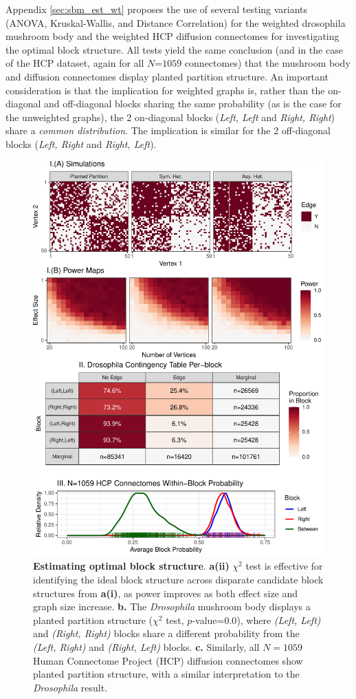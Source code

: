 Appendix \ref{sec:sbm_est_wt} proposes the use of several testing variants (ANOVA, Kruskal-Wallis, and Distance Correlation) for the weighted drosophila mushroom body and the weighted HCP diffusion connectomes for investigating the optimal block structure. All tests yield the same conclusion (and in the case of the HCP dataset, again for all $N$=$1059$ connectomes) that the mushroom body and diffusion connectomes display planted partition structure. An important consideration is that the implication for weighted graphs is, rather than the on-diagonal and off-diagonal blocks sharing the same probability (as is the case for the unweighted graphs), the 2 on-diagonal blocks (\textit{Left, Left} and \textit{Right, Right}) share a \textit{common distribution}. The implication is similar for the 2 off-diagonal blocks (\textit{Left, Right} and \textit{Right, Left}).

\begin{figure}
    \centering
    \includegraphics[width=.8\linewidth]{figures/dnd/sbm_uwt.pdf}
    \caption{\textbf{Estimating optimal block structure}. \textbf{a(ii)} $\chi^2$ test is effective for identifying the ideal block structure across disparate candidate block structures from \textbf{a(i)}, as power improves as both effect size and graph size increase. \textbf{b.} The \textit{Drosophila} mushroom body displays a planted partition structure ($\chi^2$ test, $p$-value=$0.0$), where \textit{(Left, Left)} and \textit{(Right, Right)} blocks share a different probability from the \textit{(Left, Right)} and \textit{(Right, Left)} blocks. \textbf{c.} Similarly, all $N=1059$ Human Connectome Project (HCP) diffusion connectomes show planted partition structure, with a similar interpretation to the \textit{Drosophila} result.}
    \label{fig:sbm_uwt}
\end{figure}



